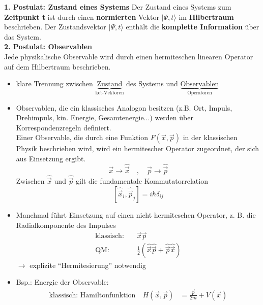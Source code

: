 \documentclass[10pt,article,colorback,accentcolor=tud9d]{scrartcl}
\begin{document}
\begin{fleqn}
  \textbf{1. Postulat: Zustand eines Systems}
    Der Zustand eines Systems zum \textbf{Zeitpunkt t} ist durch einen \textbf{normierten} Vektor $\left.\right|\Psi,t\rangle$ im \textbf{Hilbertraum} beschrieben. Der Zustandsvektor $\left.\right|\Psi,t\rangle$ enthält die \textbf{komplette Information} über das System.\\
  \textbf{2. Postulat: Observablen}\\
    Jede physikalische Observable wird durch einen hermiteschen linearen Operator auf dem Hilbertraum beschrieben. 
    \begin{itemize}
      \item klare Trennung zwischen $\underbrace{\text{Zustand}}_{\text{ket-Vektoren}}$ des Systems und $\underbrace{\text{Observablen}}_{\text{Operatoren}}$
      \item Observablen, die ein klassisches Analogon besitzen (z.B. Ort, Impuls, Drehimpuls, kin. Energie, Gesamtenergie...) werden über Korrespondenzregeln definiert. \\
        Einer Observable, die durch eine Funktion $F(\vec{x},\vec{p})$ in der klassischen Physik beschrieben wird, wird ein hermitescher Operator zugeordnet, der sich aus Einsetzung ergibt. 
        $$
        \vec{x} \rightarrow \hat{\vec{x}} \quad, \quad \vec{p} \rightarrow \hat{\vec{p}}
        $$
        Zwischen $\hat{\vec{x}}$ und $\hat{\vec{p}}$ gilt die fundamentale Kommutatorrelation
        \begin{equation}
        \left[\hat{\vec{x}}_i, \hat{\vec{p}}_j\right]=i\hbar\delta_{ij}
        \end{equation}
      \item Manchmal führt Einsetzung auf einen nicht hermiteschen Operator, z. B. die Radialkomponente des Impulses
        \begin{equation}
        \begin{aligned}
          \text{klassisch:} \quad &\vec{x}\vec{p}\\
          \text{QM:} \quad &\frac{1}{2}\left(\hat{\vec{x}}\hat{\vec{p}}+\hat{\vec{p}}\hat{\vec{x}}\right)
        \end{aligned}
        \end{equation}
        $\rightarrow$ explizite "`Hermitesierung"' notwendig
      \item Bsp.: Energie der Observable:
        \begin{equation}
        \begin{aligned}
          \text{klassisch: Hamiltonfunktion} \quad H(\vec{x},\vec{p})&=\frac{\vec{p}}{2m} + V(\vec{x})\\

\end{aligned}
\end{equation}
\end{itemize}
\end{fleqn}
\end{document}
